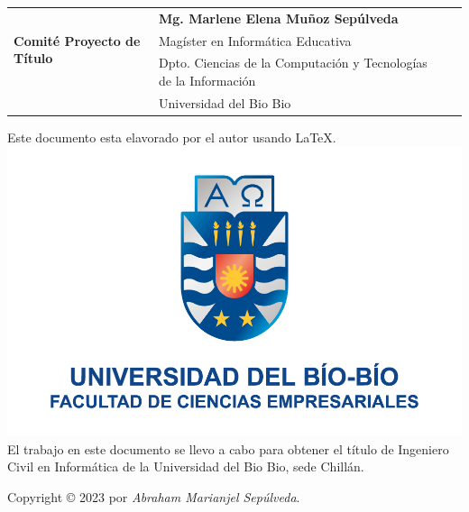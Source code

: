 \begin{frontmatter}
\begin{flushleft}
\begin{tabular}{ l | l l l}
			\multirow{3}{3.4cm}{\textbf{\large Comité Proyecto de Título}} & {\textbf{\large Mg. Marlene Elena Muñoz Sepúlveda}}\\
			& {Magíster en Informática Educativa}\\
			& {Dpto. Ciencias de la Computación y Tecnologías de la Información}\\
			& {Universidad del Bio Bio}\\

		\end{tabular}\par
	\end{flushleft}
	

	\vspace{1cm}
	\begin{minipage}[t]{15cm}
		Este documento esta elavorado por el autor usando \LaTeX. 				\includegraphics[scale=0.19]{img/logo-face.png}  \\
		El trabajo en este documento se llevo a cabo para obtener el título de Ingeniero Civil en Informática de la Universidad del Bio Bio, sede Chillán.\\
	\par Copyright © 2023 por \textit{Abraham Marianjel Sepúlveda}.
	\end{minipage}
	
\end{frontmatter}